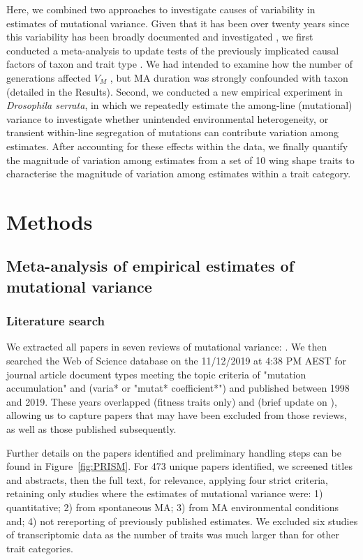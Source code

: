 Here, we combined two approaches to investigate causes of variability in estimates of mutational variance. Given that it has been over twenty years since this variability has been broadly documented and investigated \citep{Houl96, Houl98,Lync99}, we first conducted a meta-analysis to update tests of the previously implicated causal factors of taxon \citep{Lync98, Lync99, Hall09} and trait type \citep{Houl96, Houl98}. We had intended to examine how the number of generations affected $V_M$ \citep{Lync86,Mack95}, but MA duration was strongly confounded with taxon (detailed in the Results). Second, we conducted a new empirical experiment in \textit{Drosophila serrata}, in which we repeatedly estimate the among-line (mutational) variance to investigate whether unintended environmental heterogeneity, or transient within-line segregation of mutations can contribute variation among estimates. After accounting for these effects within the data, we finally quantify the magnitude of variation among estimates from a set of 10 wing shape traits to characterise the magnitude of variation among estimates within a trait category.\par

\section{Methods} 
\subsection{Meta-analysis of empirical estimates of mutational variance} 
\subsubsection{Literature search} 
We extracted all papers in seven reviews of mutational variance: \citet{Lync88b,Keig93,Houl96,Lync98,Lync99,Hall09, Wals18}. We then searched the Web of Science database on the 11/12/2019 at 4:38 PM AEST for journal article document types meeting the topic criteria of "mutation accumulation" and (varia* or "mutat* coefficient*") and published between 1998 and 2019. These years overlapped \citet{Hall09} (fitness traits only) and \citet{Wals18} (brief update on \citealp{Lync98}), allowing us to capture papers that may have been excluded from those reviews, as well as those published subsequently. \par
Further details on the papers identified and preliminary handling steps can be found in Figure~\ref{fig:PRISM}. For 473 unique papers identified, we screened titles and abstracts, then the full text, for relevance, applying four strict criteria, retaining only studies where the estimates of mutational variance were: 1) quantitative; 2) from spontaneous MA; 3) from MA environmental conditions and; 4) not rereporting of previously published estimates. We excluded six studies of transcriptomic data as the number of traits was much larger than for other trait categories.\par

